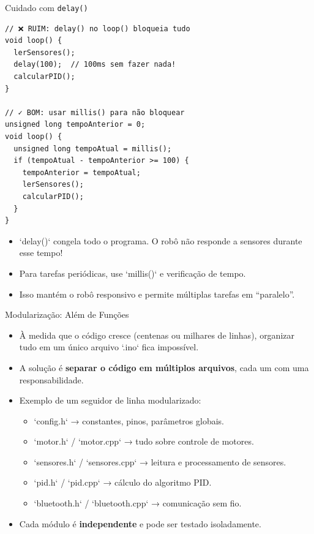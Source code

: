 \documentclass[10pt]{beamer}
\begin{document}
\begin{frame}[fragile]{Cuidado com \texttt{delay()}}
\begin{lstlisting}
// ❌ RUIM: delay() no loop() bloqueia tudo
void loop() {
  lerSensores();
  delay(100);  // 100ms sem fazer nada!
  calcularPID();
}

// ✓ BOM: usar millis() para não bloquear
unsigned long tempoAnterior = 0;
void loop() {
  unsigned long tempoAtual = millis();
  if (tempoAtual - tempoAnterior >= 100) {
    tempoAnterior = tempoAtual;
    lerSensores();
    calcularPID();
  }
}
\end{lstlisting}

  \begin{itemize}
    \item `delay()` congela todo o programa. O robô não responde a sensores durante esse tempo!
    \item Para tarefas periódicas, use `millis()` e verificação de tempo.
    \item Isso mantém o robô responsivo e permite múltiplas tarefas em ``paralelo''.
  \end{itemize}
\end{frame}

\begin{frame}{Modularização: Além de Funções}
  \begin{itemize}
    \item À medida que o código cresce (centenas ou milhares de linhas), organizar tudo em um único arquivo `.ino` fica impossível.
    \item A solução é \textbf{separar o código em múltiplos arquivos}, cada um com uma responsabilidade.
    \item Exemplo de um seguidor de linha modularizado:
    \begin{itemize}
      \item `config.h` → constantes, pinos, parâmetros globais.
      \item `motor.h` / `motor.cpp` → tudo sobre controle de motores.
      \item `sensores.h` / `sensores.cpp` → leitura e processamento de sensores.
      \item `pid.h` / `pid.cpp` → cálculo do algoritmo PID.
      \item `bluetooth.h` / `bluetooth.cpp` → comunicação sem fio.
    \end{itemize}
    \item Cada módulo é \textbf{independente} e pode ser testado isoladamente.
  \end{itemize}
\end{frame}
\end{document}
